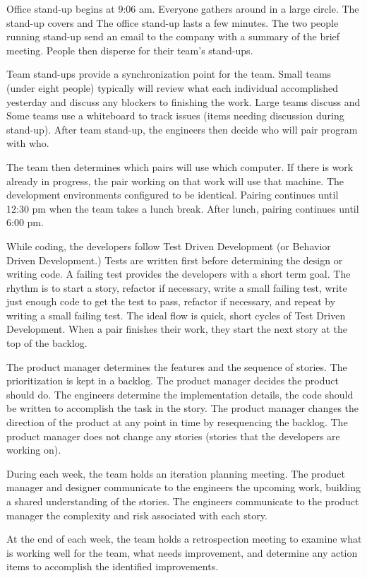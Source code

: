 Office stand-up begins at 9:06 am. Everyone gathers around in a large circle. The stand-up covers    and  The office stand-up lasts a few minutes. The two people running stand-up send an email to the company with a summary of the brief meeting. People then disperse for their team's stand-ups.


Team stand-ups provide a synchronization point for the team. Small teams (under eight people) typically will review what each individual accomplished yesterday and discuss any blockers to finishing the work. Large teams discuss  and  Some teams use a whiteboard to track  issues (items needing discussion during stand-up). After team stand-up, the engineers then decide  who will pair program with who. 


The team then determines which pairs will use which computer. If there is work already in progress, the pair working on that work will use that machine. The development environments configured to be identical. Pairing continues until 12:30 pm when the team takes a lunch break. After lunch, pairing continues until 6:00 pm. 


While coding, the developers follow Test Driven Development (or Behavior Driven Development.) Tests are written first before determining the design or writing code. A failing test provides the developers with a short term goal. The rhythm is to start a story, refactor if necessary, write a small failing test, write just enough code to get the test to pass, refactor if necessary, and repeat by writing a small failing test. The ideal flow is quick, short cycles of Test Driven Development. When a pair finishes their work, they start the next story at the top of the backlog. 


The product manager determines the features and the sequence of stories. The prioritization is kept in a backlog. The product manager decides  the product should do. The engineers determine the implementation details,  the code should be written to accomplish the task in the story. The product manager changes the direction of the product at any point in time by resequencing the backlog. The product manager does not change any  stories (stories that the developers are working on).


During each week, the team holds an iteration planning meeting. The product manager and designer communicate to the engineers the upcoming work, building a shared understanding of the stories. The engineers communicate to the product manager the complexity and risk associated with each story.


At the end of each week, the team holds a retrospection meeting to examine what is working well for the team, what needs improvement, and determine any action items to accomplish the identified improvements.

